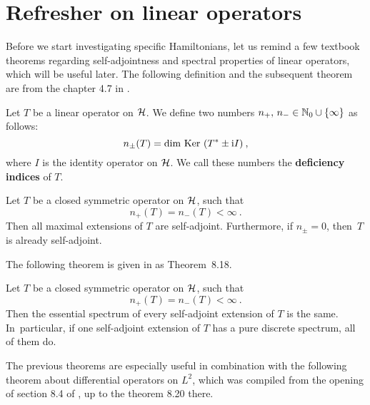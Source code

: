 \section{Refresher on linear operators}
Before we start investigating specific Hamiltonians, let us remind a few textbook theorems regarding self-adjointness and spectral properties of linear operators, which will be useful later. The following definition and the subsequent theorem are from the chapter 4.7 in \cite{BEH}.
\begin{defn}
    \label{defn-deficiency-indices}
    Let $T$ be a linear operator on $\mathcal{H}$. We define two numbers $n_+, \, n_- \in \mathbb{N}_0 \cup \{ \infty \}$ as follows:
    \begin{equation*}
        n_\pm(T) = \mathrm{dim~Ker~} (T^* \pm \mathrm{i} I) \: ,
    \end{equation*}
    where $I$ is the identity operator on $\mathcal{H}$. We call these numbers the \textbf{deficiency indices} of $T$.
\end{defn}
\begin{thm}
    \label{thm-deficiency-self-adj}
    Let $T$ be a closed symmetric operator on $\mathcal{H}$, such that
    \begin{equation*}
        n_+(T) = n_-(T) < \infty \: .
    \end{equation*}
    Then all maximal extensions of $T$ are self-adjoint. Furthermore, if $n_\pm = 0$, then~$T$ is already self-adjoint.
\end{thm}
The following theorem is given in \cite{Weidmann} as Theorem~8.18.
\begin{thm}
    \label{thm-sym-extension-spectrum}
    Let $T$ be a closed symmetric operator on $\mathcal{H}$, such that
    \begin{equation*}
        n_+(T) = n_-(T) < \infty \: .
    \end{equation*}
    Then the essential spectrum of every self-adjoint extension of $T$ is the same. In~particular, if one self-adjoint extension of $T$ has a pure discrete spectrum, all of them do.
\end{thm}
The previous theorems are especially useful in combination with the following theorem about differential operators on $L^2$, which was compiled from the opening of section 8.4 of \cite{Weidmann}, up to the theorem 8.20 there.
